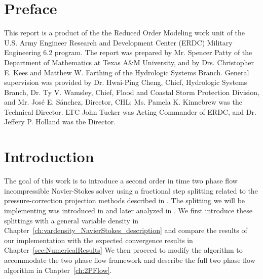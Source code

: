 \documentclass[letterpaper]{erdc}
\begin{document}



\maketitle
\setcounter{tocdepth}{1}
\tableofcontents

\listoffiguresandtables
%
\chapter{Preface}

This report is a product of the the Reduced Order Modeling work unit of the
U.S. Army Engineer Research and Development Center (ERDC) Military Engineering
6.2 program.  The report was prepared by Mr. Spencer Patty of the Department of
Mathematics at Texas A\&M University, and by Drs. Christopher E. Kees and
Matthew W. Farthing of the Hydrologic Systems Branch.
General supervision was
provided by Dr. Hwai-Ping Cheng, Chief, Hydrologic Systems Branch, Dr. Ty
V. Wamsley, Chief, Flood and Coastal Storm Protection Division, and Mr. 
Jos\'{e} E. S\'{a}nchez, Director, CHL; Ms. Pamela K. Kinnebrew was the 
Technical Director.  LTC John Tucker was Acting Commander of ERDC, and 
Dr. Jeffery P. Holland was the Director.

\mainmatter

\chapter{Introduction}

The goal of this work is to introduce a second order in time two phase flow
incompressible Navier-Stokes solver using a fractional step splitting related
to the pressure-correction projection methods described in
\cite{guermond2006overview}.  The splitting we will be implementing was
introduced in \cite{guermond2009splitting} and later analyzed in
\cite{guermond2011error}.  We first introduce these splittings with a general
variable density in Chapter~\ref{ch:vardensity_NavierStokes_description} and
compare the results of our implementation with the expected convergence results
in Chapter~\ref{sec:NumericalResults} We then proceed to modify the algorithm
to accommodate the two phase flow framework and describe the full two phase
flow algorithm in Chapter~\ref{ch:2PFlow}.
\end{document}
